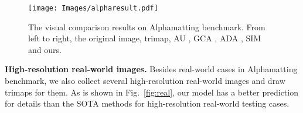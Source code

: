 \documentclass[10pt,twocolumn,letterpaper]{article}
\begin{document}
\begin{figure*}[t]
	\centering
	\texttt{[image: Images/alpharesult.pdf]}
	\caption{The visual comparison results on Alphamatting benchmark. From left to right, the original image, trimap, AU \cite{a2u}, GCA \cite{gca}, ADA \cite{adamatting}, SIM \cite{sim} and ours. }
	\label{fig:alpharesult}
\end{figure*}

\textbf{High-resolution real-world images.} Besides real-world cases in Alphamatting \cite{alphamatting} benchmark, we also collect  several high-resolution real-world images and  draw trimaps for them. As is shown in Fig.~\ref{fig:real}, our model has a better prediction for details than the SOTA methods \cite{deepmatting,indexnet,gca} for high-resolution real-world testing cases.
\end{document}
